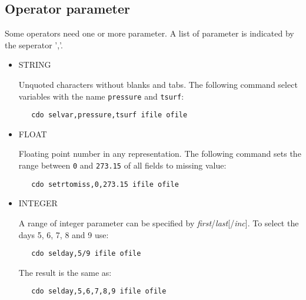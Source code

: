 \subsection{Operator parameter}

Some operators need one or more parameter. A list of parameter is indicated by the seperator ','.

\begin{itemize}
\item STRING

Unquoted characters without blanks and tabs.
The following command select variables with the name {\tt pressure} and {\tt tsurf}:
\begin{verbatim}
   cdo selvar,pressure,tsurf ifile ofile
\end{verbatim}

\item FLOAT

Floating point number in any representation.
The following command sets the range between {\tt 0} and {\tt 273.15}
of all fields to missing value:
\begin{verbatim}
   cdo setrtomiss,0,273.15 ifile ofile
\end{verbatim}

\item INTEGER

A range of integer parameter can be specified by {\it first}/{\it last}[/{\it inc}].
To select the days 5, 6, 7, 8 and 9 use:
\begin{verbatim}
   cdo selday,5/9 ifile ofile
\end{verbatim}
The result is the same as:
\begin{verbatim}
   cdo selday,5,6,7,8,9 ifile ofile
\end{verbatim}
\end{itemize}
